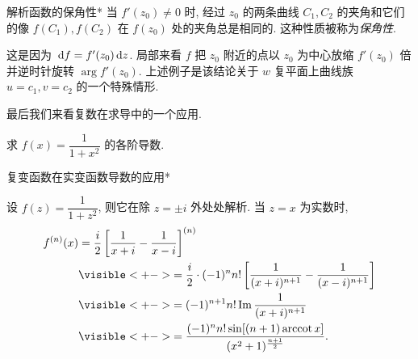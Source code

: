 \begin{frame}{解析函数的保角性*}
\onslide<+->
当 $f'(z_0)\neq 0$ 时, 
\onslide<+->
经过 $z_0$ 的两条曲线 $C_1,C_2$ 的夹角和它们的像 $f(C_1),f(C_2)$ 在 $f(z_0)$ 处的夹角总是相同的.
\onslide<+->
这种性质被称为\emph{保角性}.

\onslide<+->
这是因为 $\,\mathrm{d} f=f'(z_0)\,\mathrm{d} z$.
\onslide<+->
局部来看 $f$ 把 $z_0$ 附近的点以 $z_0$ 为中心放缩 $f'(z_0)$ 倍并逆时针旋转 $\arg{f'(z_0)}$.
\onslide<+->
上述例子是该结论关于 $w$ 复平面上曲线族 $u=c_1,v=c_2$ 的一个特殊情形.

\onslide<+->
最后我们来看复数在求导中的一个应用.
\begin{example}
求 $f(x)=\dfrac1{1+x^2}$ 的各阶导数.
\end{example}
\end{frame}


\begin{frame}{复变函数在实变函数导数的应用*}
\begin{solution}
设 $f(z)=\dfrac1{1+z^2}$, 则它在除 $z=\pm i$ 外处处解析.
\onslide<+->
当 $z=x$ 为实数时,
\onslide<+->
\begin{align*}
f^{(n)}(x)&=\frac i2\left[\frac1{x+i}-\frac1{x-i}\right]^{(n)}\\
&\visible<+->{=\frac i2\cdot(-1)^n n!\left[\frac1{(x+i)^{n+1}}-\frac1{(x-i)^{n+1}}\right]}\\
&\visible<+->{=(-1)^{n+1}n!\Im\frac1{(x+i)^{n+1}}}\\
&\visible<+->{=\frac{(-1)^nn!\sin[(n+1)\arccot x]}{(x^2+1)^{\frac{n+1}2}}.}
\end{align*}
\end{solution}
\end{frame}

